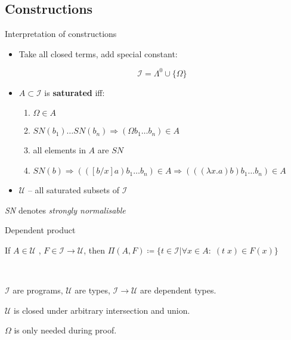 \documentclass{beamer}
\begin{document}
\subsection{Constructions}

\begin{frame}{Interpretation of constructions}
\begin{itemize}
\item Take all closed terms, add special constant:

$$\mathscr{I} = \Lambda^0 \cup \{ \Omega \}$$

\item $A \subset \mathscr{I}$ is \textbf{saturated} iff:

\begin{enumerate}
\item $\Omega \in A$
\item $SN(b_1) \dots SN(b_n)  \Rightarrow (\Omega b_1 \dots b_n) \in A$
\item all elements in $A$ are $SN$
\item $SN(b) \Rightarrow (([ b/x ] a) b_1 \dots b_n) \in A \Rightarrow (((\lambda x. a) b) b_1\dots b_n) \in A$
\end{enumerate}
\item $\mathscr{U}$ -- all saturated subsets of $\mathscr{I}$
\end{itemize}
\textit{SN} denotes \textit{strongly normalisable}


\end{frame}


\begin{frame}[fragile]{Dependent product}

\begin{definition}
If $A \in \mathscr{U}$ , $F \in \mathscr{I} \rightarrow \mathscr{U}$, then 
$\Pi(A,F) \coloneqq \{ t \in \mathscr{I} | \forall x \in A : \; (t \; x) \in F(x)\}$

\end{definition}

~
 
$\mathscr{I}$ are programs, $\mathscr{U}$ are types, $\mathscr{I}\rightarrow \mathscr{U}$ are dependent types.

\begin{lemma}
$\mathscr{U}$ is closed under arbitrary intersection and union.

\end{lemma}

$\Omega$ is only needed during proof. 


\end{frame}
\end{document}
